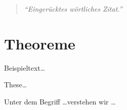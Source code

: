 \lipsum[10]

\begin{quote}
\textit{\enquote{Eingerücktes wörtliches Zitat.}}\cite[S. 14ff]{ParquetStats}
\end{quote}

\lipsum[10]

\section{Theoreme}

\lipsum[2]

\begin{beispiel}
Beispieltext\dots
\end{beispiel}
 
\lipsum[2]

\begin{these}
These\dots
\end{these}
 
\lipsum[2]
 
\begin{definition}
Unter dem Begriff \dots verstehen wir \dots
\end{definition}

\lipsum[2]